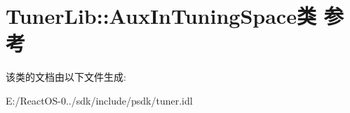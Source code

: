\hypertarget{class_tuner_lib_1_1_aux_in_tuning_space}{}\section{Tuner\+Lib\+:\+:Aux\+In\+Tuning\+Space类 参考}
\label{class_tuner_lib_1_1_aux_in_tuning_space}


该类的文档由以下文件生成\+:\begin{DoxyCompactItemize}
\item 
E\+:/\+React\+O\+S-\/0../sdk/include/psdk/tuner.\+idl\end{DoxyCompactItemize}
